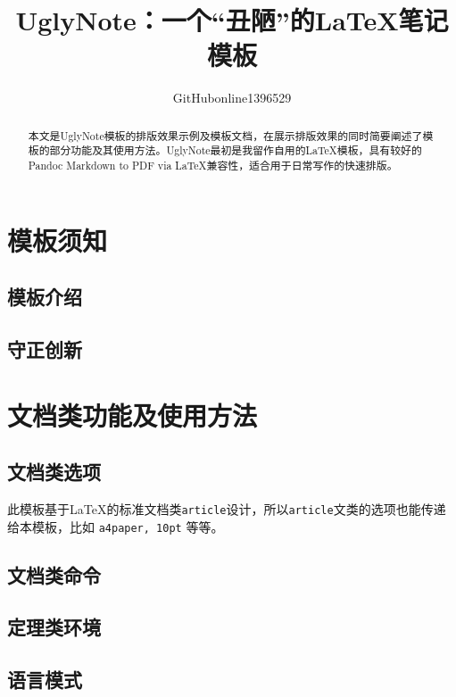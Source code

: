 \documentclass[12pt, blue]{uglynote}
\title{\bfseries UglyNote：一个“丑陋”的\LaTeX{}笔记模板}
\author{GitHubonline1396529}
\date{\zhdate{2022/12/31}}
\begin{document}
\maketitle
\begin{abstract}
  本文是UglyNote模板的排版效果示例及模板文档，在展示排版效果的同时简要阐述了模板的部分功能及其使用方法。UglyNote最初是我留作自用的\LaTeX 模板，具有较好的Pandoc Markdown to PDF via \LaTeX 兼容性，适合用于日常写作的快速排版。

\end{abstract}

\section{模板须知}
\subsection{模板介绍}


\subsection{守正创新}


\section{文档类功能及使用方法}
\subsection{文档类选项}\label{ssec:classoptions}

此模板基于\LaTeX{}的标准文档类\texttt{article}设计，所以\texttt{article}文类的选项也能传递给本模板，比如 \texttt{a4paper, 10pt} 等等。



\subsection{文档类命令}


\subsection{定理类环境}


\subsection{语言模式}

\end{document}
